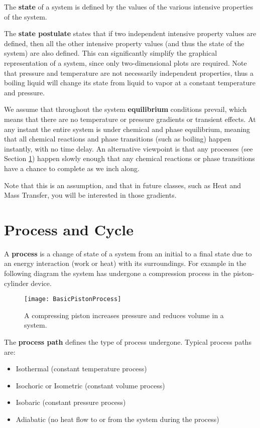 The {\bf state} of a system is defined by the values of the various intensive properties of the system.

The {\bf state postulate} states that if two independent intensive property values are defined, then all the other intensive property values (and thus the state of the system) are also defined. This can significantly simplify the graphical representation of a system, since only two-dimensional plots are required. Note that pressure and temperature are not necessarily independent properties, thus a boiling liquid will change its state from liquid to vapor at a constant temperature and pressure.

We assume that throughout the system {\bf equilibrium} conditions prevail, which means that there are no temperature or pressure gradients or transient effects. At any instant the entire system is under chemical and phase equilibrium, meaning that all chemical reactions and phase transitions (such as boiling) happen instantly, with no time delay.  An alternative viewpoint is that any processes (see Section \ref{sec:ch1_process}) happen slowly enough that any chemical reactions or phase transitions have a chance to complete as we inch along.

Note that this is an assumption, and that in future classes, such as Heat and Mass Transfer, you will be interested in those gradients.


\section{Process and Cycle} \label{sec:ch1_process}

A {\bf process} is a change of state of a system from an initial to a final state due to an energy interaction (work or heat) with its surroundings. For example in the following diagram the system has undergone a compression process in the piston-cylinder device.

\begin{figure}[H]
\centering
\texttt{[image: BasicPistonProcess]}
\caption{A compressing piston increases pressure and reduces volume in a system.}
\label{fig:ch1_process}
\end{figure}

The {\bf process path} defines the type of process undergone. Typical process paths are:
\begin{itemize}
\item Isothermal (constant temperature process)
\item Isochoric or Isometric (constant volume process)
\item Isobaric (constant pressure process)
\item Adiabatic (no heat flow to or from the system during the process)
\end{itemize}

